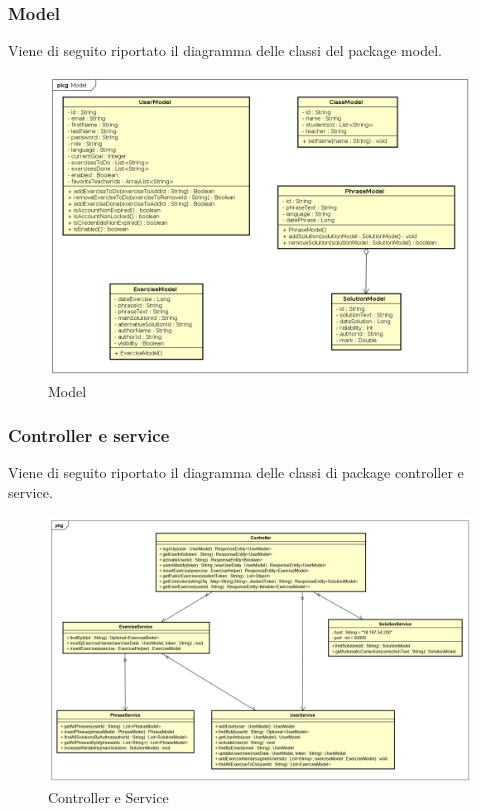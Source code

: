 \newpage
\subsubsection{Model}
Viene di seguito riportato il diagramma delle classi del package model.
\begin{figure}[H]
\centering
\includegraphics[width=17cm, keepaspectratio]{img/model.png} 
\caption{Model}
\end{figure}
\newpage

\subsubsection{Controller e service}
Viene di seguito riportato il diagramma delle classi di package controller e service.
\begin{figure}[H]
\centering
\includegraphics[width=17cm, keepaspectratio]{img/Controller-service.png} 
\caption{Controller e Service}
\end{figure}

